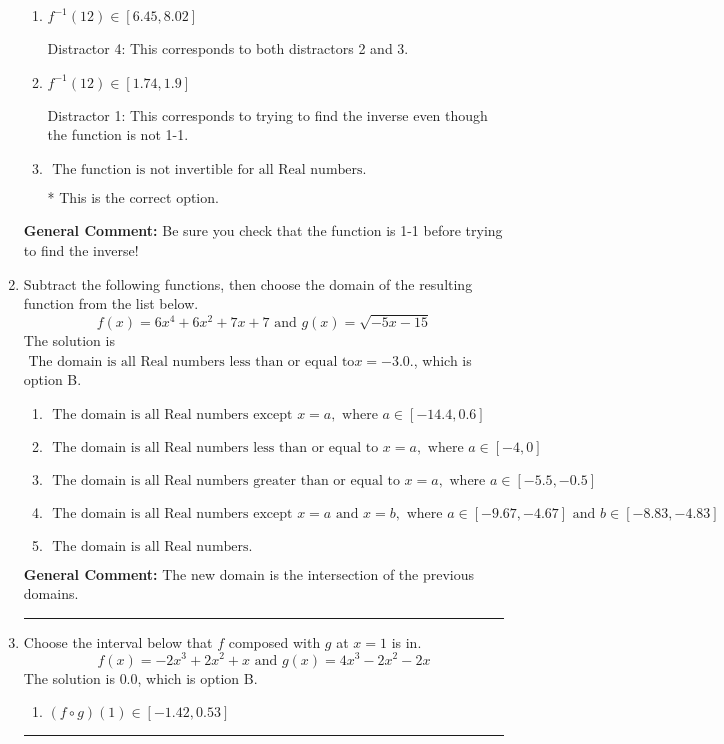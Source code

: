 \documentclass{extbook}[14pt]
\newcommand{\litem}[1]{\item #1

\rule{\textwidth}{0.4pt}}
\begin{document}
\begin{enumerate}
{\begin{enumerate}[label=\Alph*.]
 Distractor 2: This corresponds to finding the (nonexistent) inverse and not subtracting by the vertical shift.
\item \( f^{-1}(12) \in [6.45, 8.02] \)

 Distractor 4: This corresponds to both distractors 2 and 3.
\item \( f^{-1}(12) \in [1.74, 1.9] \)

 Distractor 1: This corresponds to trying to find the inverse even though the function is not 1-1. 
\item \( \text{ The function is not invertible for all Real numbers. } \)

* This is the correct option.
\end{enumerate}

\textbf{General Comment:} Be sure you check that the function is 1-1 before trying to find the inverse!
}
\litem{
Subtract the following functions, then choose the domain of the resulting function from the list below.
\[ f(x) = 6x^{4} +6 x^{2} +7 x + 7 \text{ and } g(x) = \sqrt{-5x-15}  \]The solution is \( \text{ The domain is all Real numbers less than or equal to} x = -3.0. \), which is option B.\begin{enumerate}[label=\Alph*.]
\item \( \text{ The domain is all Real numbers except } x = a, \text{ where } a \in [-14.4, 0.6] \)


\item \( \text{ The domain is all Real numbers less than or equal to } x = a, \text{ where } a \in [-4, 0] \)


\item \( \text{ The domain is all Real numbers greater than or equal to } x = a, \text{ where } a \in [-5.5, -0.5] \)


\item \( \text{ The domain is all Real numbers except } x = a \text{ and } x = b, \text{ where } a \in [-9.67, -4.67] \text{ and } b \in [-8.83, -4.83] \)


\item \( \text{ The domain is all Real numbers. } \)


\end{enumerate}

\textbf{General Comment:} The new domain is the intersection of the previous domains.
}
\litem{
Choose the interval below that $f$ composed with $g$ at $x=1$ is in.
\[ f(x) = -2x^{3} +2 x^{2} +x \text{ and } g(x) = 4x^{3} -2 x^{2} -2 x \]The solution is \( 0.0 \), which is option B.\begin{enumerate}[label=\Alph*.]
\item \( (f \circ g)(1) \in [-1.42, 0.53] \)


\end{enumerate}}
\end{enumerate}
\end{document}
